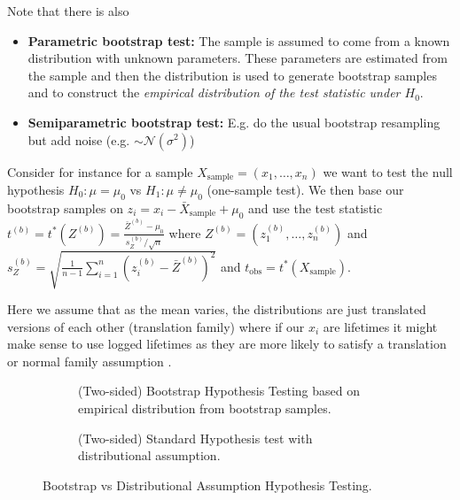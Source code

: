 Note that there is also
\begin{itemize}
    \item \textbf{Parametric bootstrap test:} The sample is assumed to come from a known distribution with unknown parameters. These parameters are estimated from the sample and then the distribution is used to generate bootstrap samples and to construct the \textit{empirical distribution of the test statistic under $H_0$}.
    \item \textbf{Semiparametric bootstrap test:} E.g. do the usual bootstrap resampling but add noise (e.g. $\sim \mathcal{N}(\sigma^2)$)
\end{itemize}

Consider for instance for a sample $X_{\text{sample}} = (x_1,\dots,x_n)$ we want to test the null hypothesis $H_0: \mu = \mu_0$ vs $H_1: \mu \neq \mu_0$ (one-sample test).
We then base our bootstrap samples on $z_i = x_i - \bar{X}_{\text{sample}} + \mu_0$ and use the test statistic $t^{(b)} = t^*\left( Z^{(b)} \right) = \frac{\bar{Z}^{(b)} - \mu_0}{s_Z^{(b)} / \sqrt{n}}$
where $Z^{(b)} = (z_1^{(b)},\dots,z_n^{(b)})$ and $s_Z^{(b)} = \sqrt{\frac{1}{n-1} \sum_{i=1}^{n} \left( z_i^{(b)} - \bar{Z}^{(b)} \right)^2}$
and $t_{\text{obs}} = t^*\left( X_{\text{sample}} \right)$.

Here we assume that as the mean varies, the distributions are just translated versions of each other
(translation family) where if our $x_i$ are lifetimes it might make sense to use
logged lifetimes as they are more likely to satisfy a translation or normal family
assumption \citep[chapter 16.4]{Efron1994}.

\begin{figure}

    \centering
    \begin{subfigure}{0.8\textwidth}
      \centering
      
      \caption{(Two-sided) Bootstrap Hypothesis Testing based on empirical distribution from bootstrap samples.}
      \label{fig:bootstrap}
    \end{subfigure}%



    \begin{subfigure}{0.8\textwidth}
      \centering
      
      \caption{(Two-sided) Standard Hypothesis test with distributional assumption.}
      \label{fig:distributional_assumptions}
    \end{subfigure}

    \caption{Bootstrap vs Distributional Assumption Hypothesis Testing.}
    \label{fig:tests}

\end{figure}

